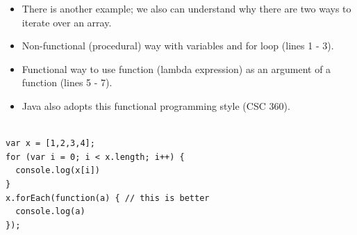 \begin{frame}[fragile]{}

\begin{itemize}
	\item There is another example; we also can understand why there are two ways to iterate over an array. 
	\item Non-functional (procedural) way with variables and for loop (lines 1 - 3).
	\item Functional way to use function (lambda expression) as an argument of a function (lines 5 - 7).
	\item Java also adopts this functional programming style (CSC 360). 
\end{itemize}

\begin{Code}{}%
\begin{lstlisting}[firstnumber=1, label=glabels, xleftmargin=0pt, basicstyle=\scriptsize]% 

var x = [1,2,3,4];
for (var i = 0; i < x.length; i++) {
  console.log(x[i])
}
x.forEach(function(a) { // this is better
  console.log(a)
});
\end{lstlisting}%
\end{Code}%
\end{frame}
